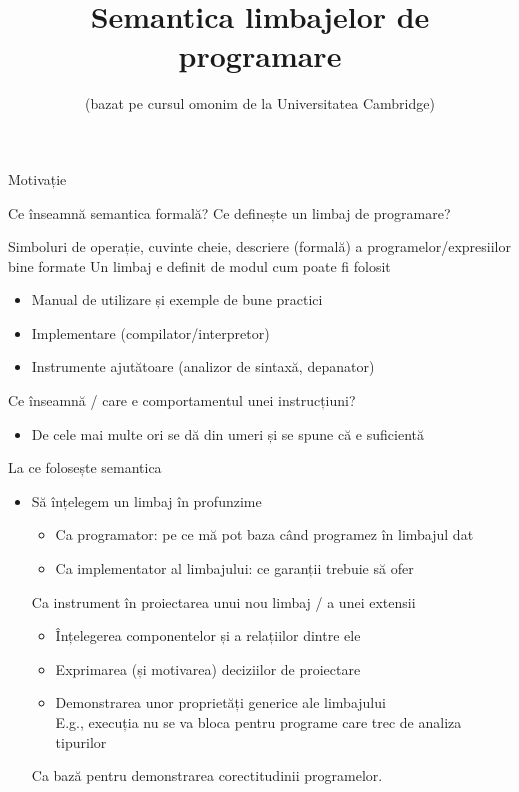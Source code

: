 \documentclass[xcolor=pdftex,romanian,colorlinks]{beamer}
\title[SLP---Introducere]{Semantica limbajelor de programare}
\subtitle{(bazat pe cursul omonim de la Universitatea Cambridge)}
\begin{document}
\begin{frame}
  \titlepage
\end{frame}

\begin{section}{Motivație}
\begin{frame}{Ce înseamnă semantica formală?}%
{Ce definește un limbaj de programare?}
\begin{description}
\vitem[Sintaxa] Simboluri de operație, cuvinte cheie, descriere (formală) a programelor/expresiilor bine formate
\vitem[Practica] Un limbaj e definit de modul cum poate fi folosit
\begin{itemize}
\item Manual de utilizare și exemple de bune practici
\item Implementare (compilator/interpretor)
\item Instrumente ajutătoare (analizor de sintaxă, depanator)
\end{itemize}  
\vitem[Semantica?] Ce înseamnă / care e comportamentul unei instrucțiuni?
\begin{itemize}
\item De cele mai multe ori se dă din umeri și se spune că  e suficientă 
\end{itemize}
\end{description}
\end{frame}

\begin{frame}{La ce folosește semantica}
\begin{itemize}
\item Să înțelegem un limbaj în profunzime
\begin{itemize}
\item Ca programator: pe ce mă pot baza când programez în limbajul dat
\item Ca implementator al limbajului: ce garanții trebuie să ofer
\end{itemize}
\vitem Ca instrument în proiectarea unui nou limbaj / a unei extensii
 \begin{itemize}
\item Înțelegerea componentelor și a relațiilor dintre ele
\item Exprimarea (și motivarea)  deciziilor de proiectare
\item Demonstrarea unor proprietăți generice ale limbajului\\
E.g., execuția nu se va bloca pentru programe care trec de analiza tipurilor
\end{itemize}
\vitem Ca bază pentru demonstrarea corectitudinii programelor.
\end{itemize}
\end{frame}


\end{section}
\end{document}
